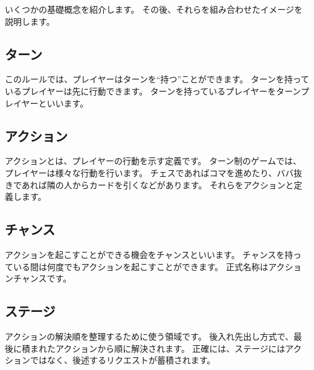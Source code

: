 \documentclass[letterpaper,10pt,dvipdfmx]{sphinxmanual}
\begin{document}
\sphinxAtStartPar
いくつかの基礎概念を紹介します。
その後、それらを組み合わせたイメージを説明します。

\ignorespaces 

\subsection{ターン}
\label{\detokenize{core/core:index-0}}\label{\detokenize{core/core:id3}}
\sphinxAtStartPar
このルールでは、プレイヤーはターンを“持つ”ことができます。
ターンを持っているプレイヤーは先に行動できます。
ターンを持っているプレイヤーをターンプレイヤーといいます。

\ignorespaces 

\subsection{アクション}
\label{\detokenize{core/core:index-1}}\label{\detokenize{core/core:id4}}
\sphinxAtStartPar
アクションとは、プレイヤーの行動を示す定義です。
ターン制のゲームでは、プレイヤーは様々な行動を行います。
チェスであればコマを進めたり、ババ抜きであれば隣の人からカードを引くなどがあります。
それらをアクションと定義します。

\ignorespaces 

\subsection{チャンス}
\label{\detokenize{core/core:index-2}}\label{\detokenize{core/core:id5}}
\sphinxAtStartPar
アクションを起こすことができる機会をチャンスといいます。
チャンスを持っている間は何度でもアクションを起こすことができます。
正式名称はアクションチャンスです。

\ignorespaces 

\subsection{ステージ}
\label{\detokenize{core/core:index-3}}\label{\detokenize{core/core:id6}}
\sphinxAtStartPar
アクションの解決順を整理するために使う領域です。
後入れ先出し方式で、最後に積まれたアクションから順に解決されます。
正確には、ステージにはアクションではなく、後述するリクエストが蓄積されます。

\ignorespaces 
\end{document}
